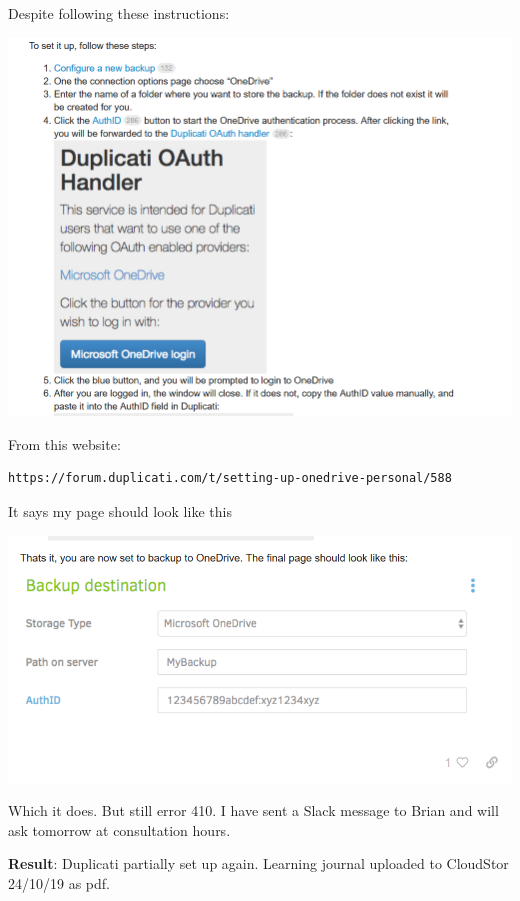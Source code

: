 \documentclass{article}
\begin{document}
Despite following these instructions:

\includegraphics[width=1.0\textwidth]{duplicati_33.PNG}

From this website: 
\begin{verbatim}https://forum.duplicati.com/t/setting-up-onedrive-personal/588\end{verbatim}

It says my page should look like this

\includegraphics[width=1.0\textwidth]{duplicati_34.PNG}

Which it does. But still error 410. I have sent a Slack message to Brian and will ask tomorrow at consultation hours.

\textbf{Result}: Duplicati partially set up again. Learning journal uploaded to CloudStor 24/10/19 as pdf.
\end{document}

